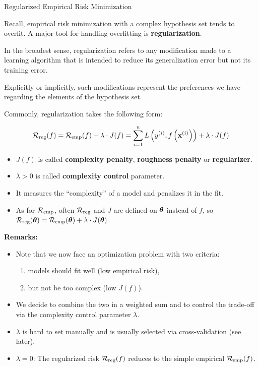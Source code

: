 \documentclass[11pt,compress,t,notes=noshow, xcolor=table]{beamer}
\begin{document}

\begin{vbframe}{Regularized Empirical Risk Minimization}

  
Recall, empirical risk minimization with a complex hypothesis set tends to overfit. A major tool for handling overfitting is \textbf{regularization}.
  
  \lz
  
In the broadest sense, regularization refers to any modification made to a learning algorithm that is intended to reduce its generalization error but not its training error.
  
  \lz
  
Explicitly or implicitly, such modifications represent the preferences we have regarding the elements of the hypothesis set. 

  \framebreak
  
  Commonly, regularization takes the following form:
  
  $$
  \mathcal{R}_{\text{reg}}(f) = \mathcal{R}_{\text{emp}}(f) + \lambda \cdot J(f) = \sum\limits_{i=1}^n L\left(y^{(i)}, f\left(\mathbf{x}^{(i)}\right)\right) + \lambda \cdot J(f)
  $$
\begin{itemize}

  \item $J(f)$ is called \textbf{complexity penalty}, \textbf{roughness penalty} or \textbf{regularizer}.
  \item $\lambda > 0$ is called \textbf{complexity control} parameter. 
  \item It measures the \enquote{complexity} of a model and penalizes it in the fit.
  \item As for $\mathcal{R}_{\text{emp}}$, often $\mathcal{R}_{\text{reg}}$ and $J$ are defined on $\bm{\theta}$ instead of $f$, so $\mathcal{R}_{\text{reg}}(\bm{\theta}) = \mathcal{R}_{\text{emp}}(\bm{\theta}) + \lambda \cdot J(\bm{\theta})$. 
\end{itemize}

\framebreak

\textbf{Remarks:}

\begin{itemize}
  \item Note that we now face an optimization problem with two criteria: 
    \begin{enumerate}
      \item models should fit well (low empirical risk),
      \item but not be too complex (low $J(f)$). 
    \end{enumerate}
  \item We decide to combine the two in a weighted sum and to control
  the trade-off via the complexity control parameter $\lambda$.
  \item $\lambda$ is hard to set manually and is usually selected via cross-validation (see later).
  \item $\lambda = 0$: The regularized risk $\mathcal{R}_{\text{reg}}(f)$ reduces to the simple empirical $\mathcal{R}_{\text{emp}}(f)$.


\end{itemize}
\end{vbframe}
\end{document}
